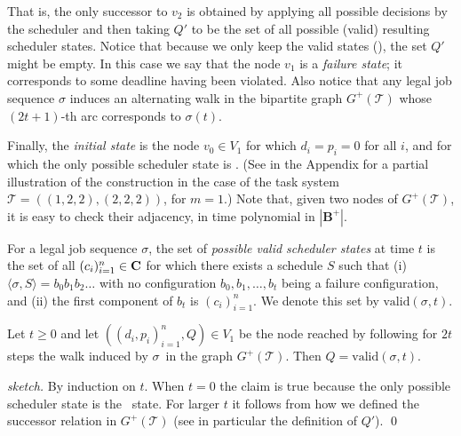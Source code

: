 \documentclass{llncs}
\newcommand{\tsys}{\ensuremath{\mathcal{T}}}
\newcommand{\seq}{\ensuremath{\sigma}}
\newcommand{\sched}{\ensuremath{S}}
\newcommand{\backlog}{\ensuremath{\mathbf{B}}}
\begin{document}
That is, the only successor to $v_2$ is obtained by applying all possible decisions by the scheduler and then taking $Q'$ to be the set of all possible (valid) resulting scheduler states. Notice that because we only keep the valid states (), the set $Q'$ might be empty. In this case we say that the node $v_1$ is a \emph{failure state}; it corresponds to some deadline having been violated. Also notice that any legal job sequence $\seq$ induces an alternating walk in the bipartite graph $G^+(\tsys)$ whose $(2t+1)$-th arc corresponds to $\seq(t)$.    

Finally, the \emph{initial state} is the node $v_0 \in V_1$ for which $d_i=p_i=0$ for all $i$, and for which the only possible scheduler state is \zero. (See  in the Appendix for a partial illustration of the construction in the case of the task system $\tsys=((1,2,2), (2,2,2))$, for $m=1$.) Note that, given two nodes of $G^+(\tsys)$, it is easy to check their adjacency, in time polynomial in $|\backlog^+|$. 

\newcommand{\valid}{\ensuremath{\mathrm{valid}}}
\begin{definition}
For a legal job sequence \seq, the set of \emph{possible valid scheduler states} at time $t$ is the set of all $(c_i)_{i=1}^n \in \mathbf{C}$ for which there exists a schedule $\sched$ such that (i) $\langle \seq, \sched \rangle = b_0 b_1 b_2 \ldots$ with no configuration $b_0,b_1,\ldots,b_t$ being a failure configuration, and (ii) the first component of $b_t$ is $(c_i)_{i=1}^n$. We denote this set by $\valid(\seq, t)$. 
\end{definition}

\begin{lemma}
\label{lem:graph-step}
Let $t \ge 0$ and let $((d_i,p_i)_{i=1}^n,Q) \in V_1$ be the node reached by following for $2t$ steps the walk induced by \seq\ in the graph $G^+(\tsys)$. Then $Q=\valid(\seq, t)$. 
\end{lemma}
\begin{proof}[sketch]
By induction on $t$. When $t=0$ the claim is true because the only possible scheduler state is the \zero\ state. For larger $t$ it follows from how we defined the successor relation in $G^+(\tsys)$ (see in particular the definition of $Q'$). 
\qed
\end{proof}
\end{document}

